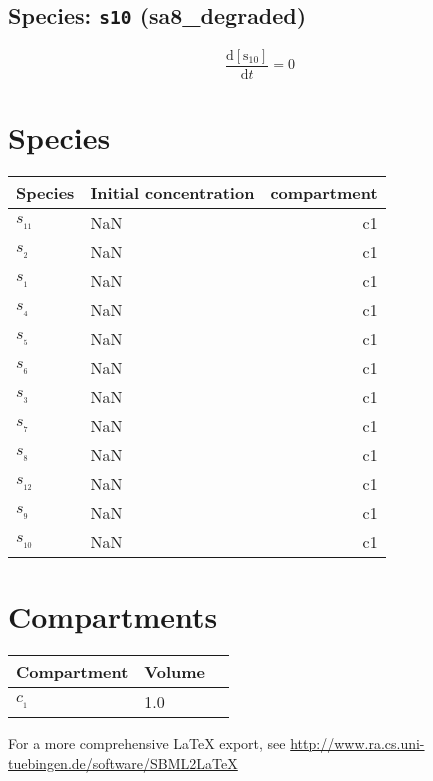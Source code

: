 \documentclass[11pt,a4paper]{scrartcl}
\begin{document}
\subsection{Species: \texttt{s10} (sa8\_degraded)}
\begin{equation}
\frac{\mathrm {d[s_{10}]}}{\mathrm dt}= 0
\end{equation}

\section{Species}
\begin{longtable}{@{}llr@{}} 
\toprule 
Species & Initial concentration & compartment \\  
\midrule
$s_{_{11}}$&NaN&c1\\
$s_{_{2}}$&NaN&c1\\
$s_{_{1}}$&NaN&c1\\
$s_{_{4}}$&NaN&c1\\
$s_{_{5}}$&NaN&c1\\
$s_{_{6}}$&NaN&c1\\
$s_{_{3}}$&NaN&c1\\
$s_{_{7}}$&NaN&c1\\
$s_{_{8}}$&NaN&c1\\
$s_{_{12}}$&NaN&c1\\
$s_{_{9}}$&NaN&c1\\
$s_{_{10}}$&NaN&c1\\
\bottomrule 
\end{longtable}
\section{Compartments}\begin{longtable}{@{}llr@{}}
\toprule 
Compartment & Volume \\  
\midrule
$c_{_{1}}$&1.0\\
\bottomrule 
\end{longtable}

\begin{center}
For a more comprehensive \LaTeX{} export, see \url{http://www.ra.cs.uni-tuebingen.de/software/SBML2LaTeX}
\end{center}
\end{document}
